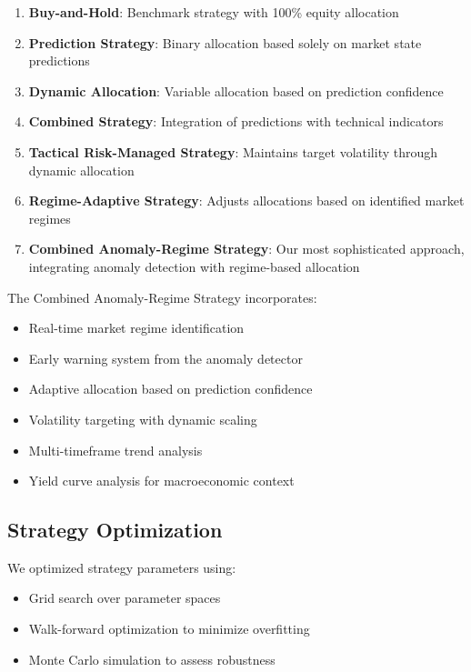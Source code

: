 \documentclass[10pt]{article}
\begin{document}
\begin{enumerate}
	\item \textbf{Buy-and-Hold}: Benchmark strategy with 100\% equity allocation

	\item \textbf{Prediction Strategy}: Binary allocation based solely on market state predictions

	\item \textbf{Dynamic Allocation}: Variable allocation based on prediction confidence

	\item \textbf{Combined Strategy}: Integration of predictions with technical indicators

	\item \textbf{Tactical Risk-Managed Strategy}: Maintains target volatility through dynamic allocation

	\item \textbf{Regime-Adaptive Strategy}: Adjusts allocations based on identified market regimes

	\item \textbf{Combined Anomaly-Regime Strategy}: Our most sophisticated approach, integrating anomaly detection with regime-based allocation
\end{enumerate}

The Combined Anomaly-Regime Strategy incorporates:
\begin{itemize}
	\item Real-time market regime identification
	\item Early warning system from the anomaly detector
	\item Adaptive allocation based on prediction confidence
	\item Volatility targeting with dynamic scaling
	\item Multi-timeframe trend analysis
	\item Yield curve analysis for macroeconomic context
\end{itemize}

\subsection{Strategy Optimization}
We optimized strategy parameters using:
\begin{itemize}
	\item Grid search over parameter spaces
	\item Walk-forward optimization to minimize overfitting
	\item Monte Carlo simulation to assess robustness
\end{itemize}
\end{document}
